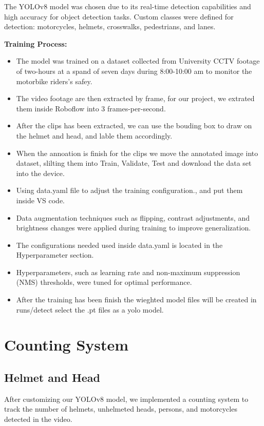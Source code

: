 	The YOLOv8 model was chosen due to its real-time detection capabilities and high accuracy for object detection tasks.
	Custom classes were defined for detection: motorcycles, helmets, crosswalks, pedestrians, and lanes.


\textbf{Training Process:}
\begin{itemize}
	 \item The model was trained on a dataset collected from University CCTV footage of two-hours at a spand of seven days during 8:00-10:00 am to monitor the motorbike riders's safey.
	\item The video footage are then extracted by frame, for our project, we extrated them inside Roboflow into 3 frames-per-second.
	\item After the clips has been extracted, we can use the bouding box to draw on the helmet and head, and lable them accordingly.
	\item When the annoation is finish for the clips we move the annotated image into dataset, slilting them into Train, Validate, Test and download the data set into the device.
	\item Using data.yaml file to adjust the training configuration., and put them inside VS code.
	\item Data augmentation techniques such as flipping, contrast adjustments, and brightness changes were applied during training to improve generalization.
	\item The configurations needed used inside data.yaml is located in the Hyperparameter section.
	\item Hyperparameters, such as learning rate and non-maximum suppression (NMS) thresholds, were tuned for optimal performance.
	\item After the training has been finish the wieghted model files will be created in runs/detect select the .pt files as a yolo model.
\end{itemize}

\section{\textbf{Counting System}}
\subsection{Helmet and Head}

	\noindent\hspace{2.5em}After customizing our YOLOv8 model, we implemented a counting system to track the number of helmets, unhelmeted heads, persons, and motorcycles detected in the video.
	
